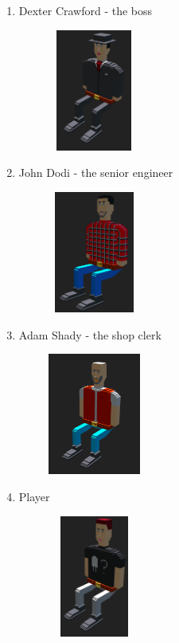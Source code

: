 \documentclass[12pt]{article}
\begin{document}
\begin{enumerate}
    \item Dexter Crawford - the boss
          \begin{center}
              \includegraphics[width=5cm, height=4cm]{boss.png}
          \end{center}
    \item John Dodi - the senior engineer
          \begin{center}
              \includegraphics[width=5cm, height=4cm]{john-dodi.png}
          \end{center}
    \item Adam Shady - the shop clerk
          \begin{center}
              \includegraphics[width=5cm, height=4cm]{clerk.png}
          \end{center}
    \item Player
          \begin{center}
              \includegraphics[width=5cm, height=4cm]{player.png}
          \end{center}
\end{enumerate}
\end{document}
